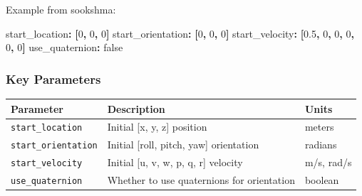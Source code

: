 \documentclass[
  letterpaper,
  DIV=11,
  numbers=noendperiod]{scrreprt}
\newenvironment{Shaded}{\begin{snugshade}}{\end{snugshade}}
\newcommand{\AttributeTok}[1]{\textcolor[rgb]{0.40,0.45,0.13}{#1}}
\newcommand{\CharTok}[1]{\textcolor[rgb]{0.13,0.47,0.30}{#1}}
\newcommand{\DecValTok}[1]{\textcolor[rgb]{0.68,0.00,0.00}{#1}}
\newcommand{\FloatTok}[1]{\textcolor[rgb]{0.68,0.00,0.00}{#1}}
\newcommand{\FunctionTok}[1]{\textcolor[rgb]{0.28,0.35,0.67}{#1}}
\newcommand{\KeywordTok}[1]{\textcolor[rgb]{0.00,0.23,0.31}{\textbf{#1}}}
\begin{document}
Example from sookshma:

\begin{Shaded}
\begin{Highlighting}[]
\FunctionTok{start\_location}\KeywordTok{:}\AttributeTok{ }\KeywordTok{[}\DecValTok{0}\KeywordTok{,}\AttributeTok{ }\DecValTok{0}\KeywordTok{,}\AttributeTok{ }\DecValTok{0}\KeywordTok{]}
\FunctionTok{start\_orientation}\KeywordTok{:}\AttributeTok{ }\KeywordTok{[}\DecValTok{0}\KeywordTok{,}\AttributeTok{ }\DecValTok{0}\KeywordTok{,}\AttributeTok{ }\DecValTok{0}\KeywordTok{]}
\FunctionTok{start\_velocity}\KeywordTok{:}\AttributeTok{ }\KeywordTok{[}\FloatTok{0.5}\KeywordTok{,}\AttributeTok{ }\DecValTok{0}\KeywordTok{,}\AttributeTok{ }\DecValTok{0}\KeywordTok{,}\AttributeTok{ }\DecValTok{0}\KeywordTok{,}\AttributeTok{ }\DecValTok{0}\KeywordTok{,}\AttributeTok{ }\DecValTok{0}\KeywordTok{]}
\FunctionTok{use\_quaternion}\KeywordTok{:}\AttributeTok{ }\CharTok{false}
\end{Highlighting}
\end{Shaded}

\subsubsection*{Key Parameters}\label{key-parameters-6}

\begin{longtable}[]{@{}
  >{\raggedright\arraybackslash}p{}
  >{\raggedright\arraybackslash}p{}
  >{\raggedright\arraybackslash}p{}@{}}
\toprule\noalign{}
\begin{minipage}[b]{\linewidth}\raggedright
Parameter
\end{minipage} & \begin{minipage}[b]{\linewidth}\raggedright
Description
\end{minipage} & \begin{minipage}[b]{\linewidth}\raggedright
Units
\end{minipage} \\
\midrule\noalign{}
\endhead
\bottomrule\noalign{}
\endlastfoot
\texttt{start\_location} & Initial {[}x, y, z{]} position & meters \\
\texttt{start\_orientation} & Initial {[}roll, pitch, yaw{]} orientation
& radians \\
\texttt{start\_velocity} & Initial {[}u, v, w, p, q, r{]} velocity &
m/s, rad/s \\
\texttt{use\_quaternion} & Whether to use quaternions for orientation &
boolean \\
\end{longtable}
\end{document}
